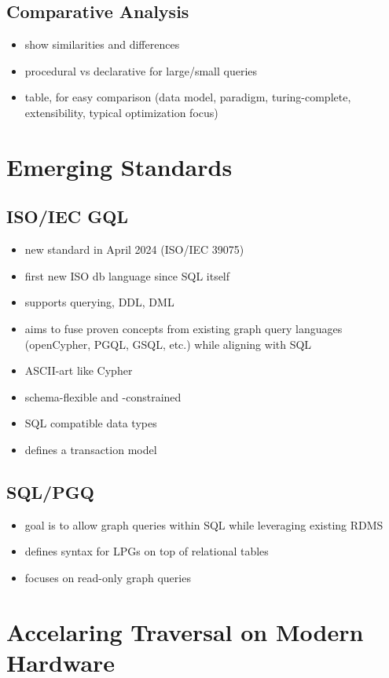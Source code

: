 \documentclass[sigconf,authordraft]{acmart}
\begin{document}
\subsection{Comparative Analysis}
\begin{itemize}
	\item show similarities and differences
	\item procedural vs declarative for large/small queries
	\item table, for easy comparison (data model, paradigm, turing-complete, extensibility, typical optimization focus)
\end{itemize}

\section{Emerging Standards}

\subsection{ISO/IEC GQL}
\begin{itemize}
	\item new standard in April 2024 (ISO/IEC 39075)
	\item first new ISO db language since SQL itself
	\item supports querying, DDL, DML
	\item aims to fuse proven concepts from existing graph query languages (openCypher, PGQL, GSQL, etc.) while aligning with SQL
	\item ASCII-art like Cypher
	\item schema-flexible and -constrained
	\item SQL compatible data types
	\item defines a transaction model
\end{itemize}

\subsection{SQL/PGQ}
\begin{itemize}
	\item goal is to allow graph queries within SQL while leveraging existing RDMS
	\item defines syntax for LPGs on top of relational tables
	\item focuses on read-only graph queries
\end{itemize}

\section{Accelaring Traversal on Modern Hardware}
\end{document}
